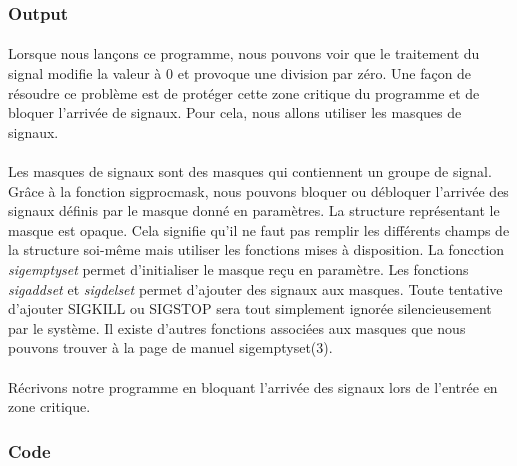 \documentclass{article}
\begin{document}


\subsubsection*{Output}



\paragraph{} Lorsque nous lançons ce programme, nous pouvons voir que le traitement du signal modifie la valeur à 0 et provoque une division par zéro. Une façon de résoudre
ce problème est de protéger cette zone critique du programme et de bloquer l'arrivée de signaux. Pour cela, nous allons utiliser les masques de signaux.

\paragraph{} Les masques de signaux sont des masques qui contiennent un groupe de signal. Grâce à la fonction sigprocmask, nous pouvons bloquer ou débloquer l'arrivée des signaux
définis par le masque donné en paramètres. La structure représentant le masque est opaque. Cela signifie qu'il ne faut pas remplir les différents champs de la structure soi-même 
mais utiliser les fonctions mises à disposition. La foncction \textit{sigemptyset} permet d'initialiser le masque reçu en paramètre. Les fonctions \textit{sigaddset} et \textit{sigdelset} permet d'ajouter des signaux aux masques.
Toute tentative d'ajouter SIGKILL ou SIGSTOP sera tout simplement ignorée silencieusement par le système. 
Il existe d'autres fonctions associées aux masques que nous pouvons trouver à la page de manuel sigemptyset(3).

\paragraph{} Récrivons notre programme en bloquant l'arrivée des signaux lors de l'entrée en zone critique.

\subsubsection*{Code}


\end{document}
